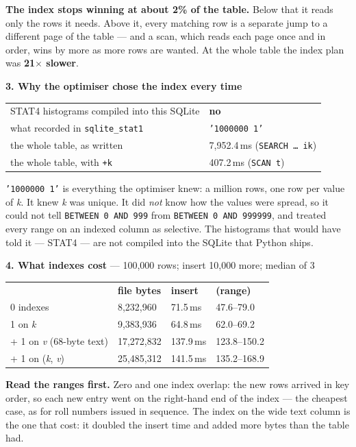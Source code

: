 \begin{measured}
\smallskip
\textbf{The index stops winning at about 2\% of the table.} Below that it reads
only the rows it needs. Above it, every matching row is a separate jump to a
different page of the table --- and a scan, which reads each page once and in
order, wins by more as more rows are wanted. At the whole table the index plan
was \textbf{21$\times$ slower}.

\medskip
\textbf{3. Why the optimiser chose the index every time}

\begin{tabular}{@{}L{7.8cm}L{6.0cm}@{}}
STAT4 histograms compiled into this SQLite & \textbf{no} \\
what  recorded in \texttt{sqlite\_stat1} & \texttt{'1000000 1'} \\
the whole table, as written & 7{,}952.4\,ms (\texttt{SEARCH \dots\ ik}) \\
the whole table, with \texttt{+k} & 407.2\,ms (\texttt{SCAN t}) \\
\end{tabular}

\smallskip
\texttt{'1000000 1'} is everything the optimiser knew: a million rows, one row
per value of \textit{k}. It knew \textit{k} was unique. It did \emph{not} know
how the values were spread, so it could not tell \texttt{BETWEEN 0 AND 999}
from \texttt{BETWEEN 0 AND 999999}, and treated every range on an indexed
column as selective. The histograms that would have told it --- STAT4 --- are
not compiled into the SQLite that Python ships.

\medskip
\textbf{4. What indexes cost} --- 100{,}000 rows; insert 10{,}000 more; median
of 3

\begin{tabular}{@{}L{3.2cm}R{3.0cm}R{3.0cm}R{3.2cm}@{}}
& \textbf{file bytes} & \textbf{insert} & \textbf{(range)} \\
0 indexes & 8{,}232{,}960  & 71.5\,ms  & 47.6--79.0 \\
1 on \textit{k} & 9{,}383{,}936 & 64.8\,ms & 62.0--69.2 \\
+ 1 on \textit{v} (68-byte text) & 17{,}272{,}832 & 137.9\,ms & 123.8--150.2 \\
+ 1 on (\textit{k}, \textit{v}) & 25{,}485{,}312 & 141.5\,ms & 135.2--168.9 \\
\end{tabular}

\smallskip
\textbf{Read the ranges first.} Zero and one index overlap: the new rows arrived
in key order, so each new entry went on the right-hand end of the index --- the
cheapest case, as for roll numbers issued in sequence. The index on the wide
text column is the one that cost: it doubled the insert time and added more
bytes than the table had.
\end{measured}

